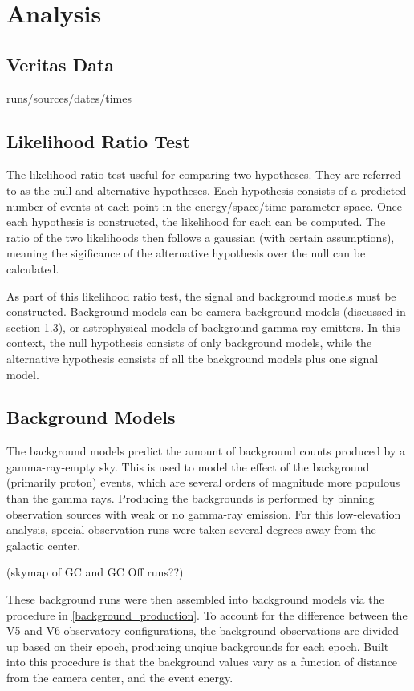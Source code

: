 \cleartooddpage[\thispagestyle{empty}]
\chapter{Analysis}

\section{Veritas Data}
runs/sources/dates/times

\section{Likelihood Ratio Test}
The likelihood ratio test useful for comparing two hypotheses.
They are referred to as the null and alternative hypotheses.
Each hypothesis consists of a predicted number of events at each point in the energy/space/time parameter space.
Once each hypothesis is constructed, the likelihood for each can be computed.
The ratio of the two likelihoods then follows a gaussian (with certain assumptions), meaning the sigificance of the alternative hypothesis over the null can be calculated.

As part of this likelihood ratio test, the signal and background models must be constructed.
Background models can be camera background models (discussed in section \ref{sec:bkgmodels}), or astrophysical models of background gamma-ray emitters.
In this context, the null hypothesis consists of only background models, while the alternative hypothesis consists of all the background models plus one signal model.

\section{Background Models}\label{sec:bkgmodels}

The background models predict the amount of background counts produced by a gamma-ray-empty sky.
This is used to model the effect of the background (primarily proton) events, which are several orders of magnitude more populous than the gamma rays.
Producing the backgrounds is performed by binning observation sources with weak or no gamma-ray emission.
For this low-elevation analysis, special observation runs were taken several degrees away from the galactic center.

(skymap of GC and GC Off runs??)

These background runs were then assembled into background models via the procedure in \ref{background_production}.
To account for the difference between the V5 and V6 observatory configurations, the background observations are divided up based on their epoch, producing unqiue backgrounds for each epoch.
Built into this procedure is that the background values vary as a function of distance from the camera center, and the event energy.

